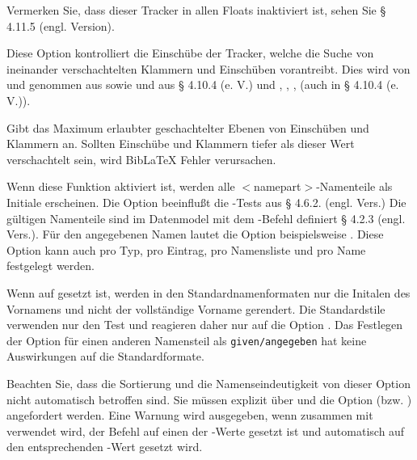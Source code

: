 \documentclass{ltxdockit}[2011/03/25]
\newcommand*{\biblatex}{BibLaTeX\xspace}
\begin{document}
\begin{optionlist}
Vermerken Sie, dass dieser Tracker in allen Floats inaktiviert ist, sehen Sie
§ 4.11.5 (engl. Version). %


Diese Option kontrolliert die Einschübe der Tracker, welche die Suche von ineinander 
verschachtelten Klammern und Einschüben vorantreibt. Dies wird von  und 
 genommen
aus  sowie  und  aus
§ 4.10.4 (e. V.)%
und , ,
,  (auch in § 4.10.4 (e. V.)).


Gibt das Maximum erlaubter geschachtelter Ebenen von
Einschüben und Klammern an. Sollten Einschübe und Klammern tiefer als dieser
Wert verschachtelt sein, wird \biblatex Fehler verursachen.


Wenn diese Funktion aktiviert ist, werden alle $<$namepart$>$-Namenteile als Initiale erscheinen. Die Option beeinflußt die -Tests aus %
§ 4.6.2. (engl. Vers.)
Die gültigen Namenteile sind im Datenmodel mit dem  -Befehl definiert %
§ 4.2.3 (engl. Vers.).
Für den angegebenen Namen lautet die Option beispielsweise .
Diese Option kann auch pro Typ, pro Eintrag, pro Namensliste und pro Name festgelegt werden.

Wenn  auf  gesetzt ist, werden in den Standardnamenformaten nur die Initalen des Vornamens und nicht der vollständige Vorname gerendert. Die Standardstile verwenden nur den Test   und reagieren daher nur auf die Option . Das Festlegen der Option
für einen anderen Namensteil als \texttt{given/angegeben} hat keine Auswirkungen auf die Standardformate.

Beachten Sie, dass die Sortierung und die Namenseindeutigkeit von dieser Option nicht automatisch 
betroffen sind. Sie müssen explizit über  und die Option 
 (bzw. ) angefordert werden. Eine Warnung wird ausgegeben, wenn  zusammen mit  verwendet wird, der Befehl auf einen der 
-Werte gesetzt ist und  automatisch auf den entsprechenden -Wert 
gesetzt wird.


\end{optionlist}
\end{document}
